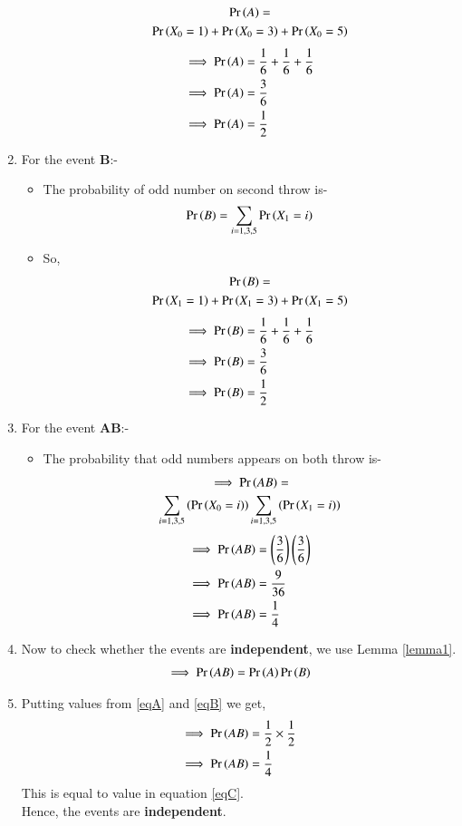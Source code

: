 \documentclass[journal,12pt,twocolumn]{IEEEtran}
\begin{document}
\begin{enumerate}
\begin{itemize}
\begin{multline}
    \Pr\left(A\right)=
    \\\Pr\left(X_0=1\right)+\Pr\left(X_0=3\right)+\Pr\left(X_0=5\right)
\end{multline}
\begin{align}
\implies\Pr\left(A\right)&=\frac{1}{6}+\frac{1}{6}+\frac{1}{6}
\\
\implies  \Pr\left(A\right) &= \frac{3}{6} 
\\
\implies \Pr\left(A\right)  &= \frac{1}{2} \label{eqA}
 \end{align}
 \end{itemize}
 \item For the event \textbf{B}:-
    \begin{itemize}
    \item The probability of odd number on second throw is-
    \begin{align}
        \Pr\left(B\right)=\sum_{i=1,3,5} \Pr\left(X_1=i\right)
    \end{align}
    \item So,
    \begin{multline}
    \Pr\left(B\right)=
    \\\Pr\left(X_1=1\right)+\Pr\left(X_1=3\right)+\Pr\left(X_1=5\right)
\end{multline}
\begin{align}
\implies \Pr\left(B\right)&=\frac{1}{6}+\frac{1}{6}+\frac{1}{6}
\\
\implies  \Pr\left(B\right) &= \frac{3}{6} 
\\
\implies  \Pr\left(B\right)&= \frac{1}{2} \label{eqB}
 \end{align}
 \end{itemize}
\item For the event \textbf{AB}:-
\begin{itemize}
    \item The probability that odd numbers appears on both throw is-
    \begin{multline}
    \implies  \Pr\left(AB\right)=\\\sum_{i=1,3,5}\left(\Pr\left(X_0=i\right)\right)\sum_{i=1,3,5}\left(\Pr\left(X_1=i\right)\right) 
    \end{multline} 
\begin{align}
\implies  \Pr\left(AB\right) &= \left(\frac{3}{6}\right)\left( \frac{3}{6} \right)
\\
\implies  \Pr\left(AB\right) &=\frac{9}{36}
\\
 \implies\Pr\left(AB\right) &=\frac{1}{4} \label{eqC}
 \end{align}
 \end{itemize}
\item Now to check whether the events are \textbf{independent}, we use Lemma \eqref{lemma1}.
\begin{align}
 \implies   \Pr\left(AB\right)= \Pr\left(A\right)\Pr\left(B\right)
    \end{align}
    \item Putting values from \eqref{eqA} and \eqref{eqB} we get,
    \begin{align}
  \implies  \Pr\left(AB\right) & = \frac{1}{2}\times\frac{1}{2}
    \\
\implies    \Pr\left(AB\right)&= \frac{1}{4}
\end{align}
This is equal to value in equation \eqref{eqC}.
\\
Hence, the events are \textbf{independent}.
\end{enumerate}
\end{document}
